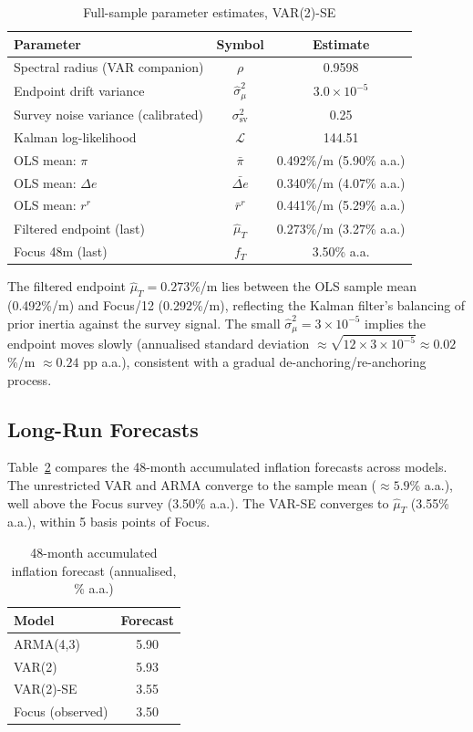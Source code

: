 \documentclass[12pt, a4paper]{article}
\begin{document}
\begin{table}[h!]
\centering
\caption{Full-sample parameter estimates, VAR(2)-SE}
\label{tab:params}
\begin{tabular}{lcc}
\toprule
Parameter & Symbol & Estimate \\
\midrule
Spectral radius (VAR companion) & $\rho$ & 0.9598 \\
Endpoint drift variance         & $\hat\sigma^2_\mu$ & $3.0\times10^{-5}$ \\
Survey noise variance (calibrated) & $\sigma^2_{\mathrm{sv}}$ & 0.25 \\
Kalman log-likelihood           & $\mathcal{L}$ & 144.51 \\
\midrule
OLS mean: $\pi$     & $\bar\pi$      & 0.492\%/m (5.90\% a.a.) \\
OLS mean: $\Delta e$& $\bar{\Delta e}$ & 0.340\%/m (4.07\% a.a.) \\
OLS mean: $r^r$     & $\bar r^r$     & 0.441\%/m (5.29\% a.a.) \\
Filtered endpoint (last)& $\hat\mu_T$ & 0.273\%/m (3.27\% a.a.) \\
Focus 48m (last)    & $f_T$          & 3.50\% a.a. \\
\bottomrule
\end{tabular}
\end{table}

The filtered endpoint $\hat\mu_T = 0.273$\%/m lies between the OLS
sample mean (0.492\%/m) and Focus/12 (0.292\%/m), reflecting the
Kalman filter's balancing of prior inertia against the survey signal.
The small $\hat\sigma^2_\mu = 3\times10^{-5}$ implies the endpoint
moves slowly (annualised standard deviation
$\approx\sqrt{12\times3\times10^{-5}}\approx 0.02$\%/m $\approx 0.24$
pp a.a.), consistent with a gradual de-anchoring/re-anchoring process.

\subsection{Long-Run Forecasts}

Table~\ref{tab:lr} compares the 48-month accumulated inflation forecasts
across models. The unrestricted VAR and ARMA converge to the sample mean
($\approx 5.9$\% a.a.), well above the Focus survey (3.50\% a.a.).
The VAR-SE converges to $\hat\mu_T$ (3.55\% a.a.), within 5 basis points
of Focus.

\begin{table}[h!]
\centering
\caption{48-month accumulated inflation forecast (annualised, \% a.a.)}
\label{tab:lr}
\begin{tabular}{lc}
\toprule
Model & Forecast \\
\midrule
ARMA(4,3)   & 5.90 \\
VAR(2)      & 5.93 \\
VAR(2)-SE   & 3.55 \\
Focus (observed) & 3.50 \\
\bottomrule
\end{tabular}
\end{table}
\end{document}
